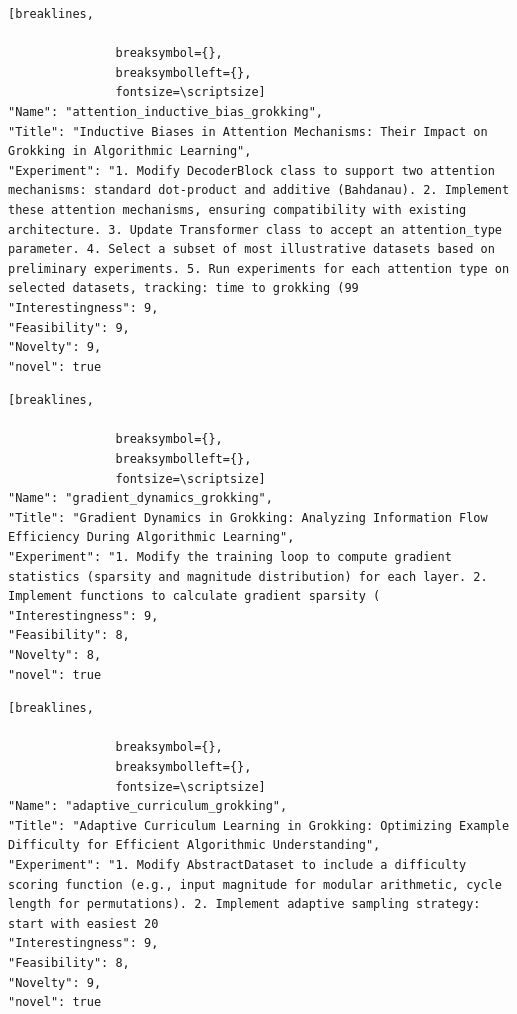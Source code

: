 \begin{tcolorbox}[
  breakable,
  colback  = blue!5!white,
  colframe = blue!75!black,
  title    = {Idea 37/50 - \texttt{attention\_inductive\_bias\_grokking}},
  fontupper=\scriptsize\ttfamily,
]
\begin{Verbatim}[breaklines,

               breaksymbol={},
               breaksymbolleft={},
               fontsize=\scriptsize]
"Name": "attention_inductive_bias_grokking",
"Title": "Inductive Biases in Attention Mechanisms: Their Impact on Grokking in Algorithmic Learning",
"Experiment": "1. Modify DecoderBlock class to support two attention mechanisms: standard dot-product and additive (Bahdanau). 2. Implement these attention mechanisms, ensuring compatibility with existing architecture. 3. Update Transformer class to accept an attention_type parameter. 4. Select a subset of most illustrative datasets based on preliminary experiments. 5. Run experiments for each attention type on selected datasets, tracking: time to grokking (99
"Interestingness": 9,
"Feasibility": 9,
"Novelty": 9,
"novel": true
\end{Verbatim}
\end{tcolorbox}

\begin{tcolorbox}[
  breakable,
  colback  = blue!5!white,
  colframe = blue!75!black,
  title    = {Idea 38/50 - \texttt{gradient\_dynamics\_grokking}},
  fontupper=\scriptsize\ttfamily,
]
\begin{Verbatim}[breaklines,

               breaksymbol={},
               breaksymbolleft={},
               fontsize=\scriptsize]
"Name": "gradient_dynamics_grokking",
"Title": "Gradient Dynamics in Grokking: Analyzing Information Flow Efficiency During Algorithmic Learning",
"Experiment": "1. Modify the training loop to compute gradient statistics (sparsity and magnitude distribution) for each layer. 2. Implement functions to calculate gradient sparsity (
"Interestingness": 9,
"Feasibility": 8,
"Novelty": 8,
"novel": true
\end{Verbatim}
\end{tcolorbox}

\begin{tcolorbox}[
  breakable,
  colback  = blue!5!white,
  colframe = blue!75!black,
  title    = {Idea 39/50 - \texttt{adaptive\_curriculum\_grokking}},
  fontupper=\scriptsize\ttfamily,
]
\begin{Verbatim}[breaklines,

               breaksymbol={},
               breaksymbolleft={},
               fontsize=\scriptsize]
"Name": "adaptive_curriculum_grokking",
"Title": "Adaptive Curriculum Learning in Grokking: Optimizing Example Difficulty for Efficient Algorithmic Understanding",
"Experiment": "1. Modify AbstractDataset to include a difficulty scoring function (e.g., input magnitude for modular arithmetic, cycle length for permutations). 2. Implement adaptive sampling strategy: start with easiest 20
"Interestingness": 9,
"Feasibility": 8,
"Novelty": 9,
"novel": true
\end{Verbatim}
\end{tcolorbox}

